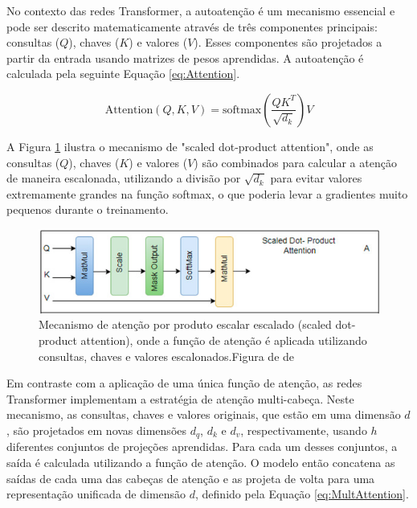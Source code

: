 No contexto das redes Transformer, a autoatenção é um mecanismo essencial e pode ser descrito matematicamente através de três componentes principais: consultas (\(Q\)), chaves (\(K\)) e valores (\(V\)). Esses componentes são projetados a partir da entrada usando matrizes de pesos aprendidas. A autoatenção é calculada pela seguinte Equação \ref{eq:Attention}.

\begin{equation}
\text{Attention}(Q, K, V) = \text{softmax}\left(\frac{QK^T}{\sqrt{d_k}}\right)V
\label{eq:Attention}
\end{equation}

A Figura \ref{fig:etrans} ilustra o mecanismo de "scaled dot-product attention", onde as consultas (\(Q\)), chaves (\(K\)) e valores (\(V\)) são combinados para calcular a atenção de maneira escalonada, utilizando a divisão por \(\sqrt{d_k}\) para evitar valores extremamente grandes na função softmax, o que poderia levar a gradientes muito pequenos durante o treinamento.

\begin{figure}
    \centering
    \includegraphics[width=1.0\linewidth]{capitulos//figuras/scalled.png}
    \caption{Mecanismo de atenção por produto escalar escalado (scaled dot-product attention), onde a função de atenção é aplicada utilizando consultas, chaves e valores escalonados.Figura de de \textcite{THIRUNAVUKARASU2024100648}}
    \label{fig:etrans}
\end{figure}

Em contraste com a aplicação de uma única função de atenção, as redes Transformer implementam a estratégia de atenção multi-cabeça. Neste mecanismo, as consultas, chaves e valores originais, que estão em uma dimensão \(d\), são projetados em novas dimensões \(d_q\), \(d_k\) e \(d_v\), respectivamente, usando \(h\) diferentes conjuntos de projeções aprendidas. Para cada um desses conjuntos, a saída é calculada utilizando a função de atenção. O modelo então concatena as saídas de cada uma das cabeças de atenção e as projeta de volta para uma representação unificada de dimensão \(d\), definido pela Equação \ref{eq:MultAttention}.

